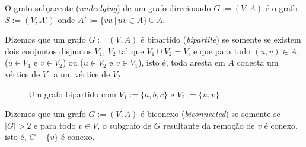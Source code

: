 \begin{mydef}
  O grafo subjacente (\textit{underlying}) de um grafo direcionado $G
  := (V, A)$ é o grafo $S := (V, A')$ onde $A' := \{vu\, |\, uv \in A\} \cup A$.
\end{mydef}

\begin{mydef}
  Dizemos que um grafo $G := (V, A)$ é bipartido (\textit{bipartite})
  se somente se existem dois conjuntos disjuntos $V_1$, $V_2$ tal que
  $V_1 \cup V_2 = V$, e que para todo $(u, v) \in A$, ($u \in
  V_1$ e $v \in V_2$) ou ($u \in V_2$ e $v \in V_1$), isto é, toda
  aresta em $A$ conecta um vértice de $V_1$ a um vértice de $V_2$.
  \begin{figure}[h]
    \centering
    \caption{Um grafo bipartido com $V_1 := \{a,b,c\}$ e $V_2 := \{u,v\}$}
  \end{figure}
  \FloatBarrier
\end{mydef}

\begin{mydef}
  Dizemos que um grafo $G := (V, A)$ é biconexo
  (\textit{biconnected}) se somente se $|G| > 2$ e para todo $v \in
  V$,  o subgrafo de $G$ resultante da remoção de $v$ é conexo, isto
  é, $G - \{v\}$ é conexo.
\end{mydef}
